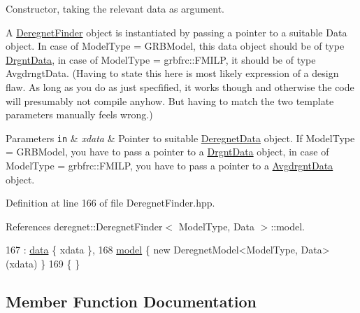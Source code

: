 Constructor, taking the relevant data as argument. 

A \hyperlink{classderegnet_1_1DeregnetFinder}{Deregnet\+Finder} object is instantiated by passing a pointer to a suitable Data object. In case of Model\+Type = G\+R\+B\+Model, this data object should be of type \hyperlink{classderegnet_1_1DrgntData}{Drgnt\+Data}, in case of Model\+Type = grbfrc\+::\+F\+M\+I\+LP, it should be of type Avgdrngt\+Data. (Having to state this here is most likely expression of a design flaw. As long as you do as just specfified, it works though and otherwise the code will presumably not compile anyhow. But having to match the two template parameters manually feels wrong.)


\begin{DoxyParams}[1]{Parameters}
\mbox{\tt in}  & {\em xdata} & Pointer to suitable \hyperlink{classderegnet_1_1DeregnetData}{Deregnet\+Data} object. If Model\+Type = G\+R\+B\+Model, you have to pass a pointer to a \hyperlink{classderegnet_1_1DrgntData}{Drgnt\+Data} object, in case of Model\+Type = grbfrc\+::\+F\+M\+I\+LP, you have to pass a pointer to a \hyperlink{classderegnet_1_1AvgdrgntData}{Avgdrgnt\+Data} object. \\
\hline
\end{DoxyParams}


Definition at line 166 of file Deregnet\+Finder.\+hpp.



References deregnet\+::\+Deregnet\+Finder$<$ Model\+Type, Data $>$\+::model.


\begin{DoxyCode}
167  : \hyperlink{classderegnet_1_1DeregnetFinder_ab158f2a6bb7f39ed3d6e4a9ffe568232}{data} \{ xdata \},
168    \hyperlink{classderegnet_1_1DeregnetFinder_ad922d8e38124b4c75daac29a928fcf5b}{model} \{ \textcolor{keyword}{new} DeregnetModel<ModelType, Data>(xdata) \}
169 \{ \}
\end{DoxyCode}


\subsection{Member Function Documentation}
\mbox{\label{classderegnet_1_1DeregnetFinder_a9bca73c631c1ce679b07f1e0664abfa2}} 
